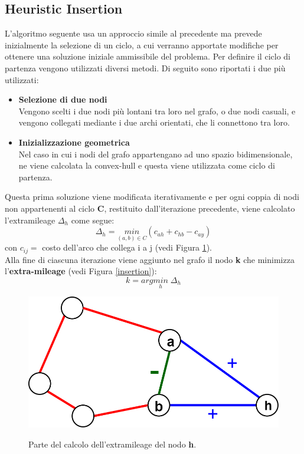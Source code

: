\subsection{Heuristic Insertion}
L'algoritmo seguente usa un approccio simile al precedente ma prevede inizialmente la selezione di un ciclo, a cui verranno apportate modifiche per ottenere una soluzione iniziale ammissibile del problema. Per definire il ciclo di partenza vengono utilizzati diversi metodi. Di seguito sono riportati i due più utilizzati:
\begin{itemize}
\item{\textbf{Selezione di due nodi}\\
Vengono scelti i due nodi più lontani tra loro nel grafo, o due nodi casuali, e vengono collegati mediante i due archi orientati, che li connettono tra loro.
}
\item{\textbf{Inizializzazione geometrica}\\
Nel caso in cui i nodi del grafo appartengano ad uno spazio bidimensionale, ne viene calcolata la convex-hull e questa viene utilizzata come ciclo di partenza.
}
\end{itemize}
Questa prima soluzione viene modificata iterativamente e per ogni coppia di nodi non appartenenti al ciclo \textbf{C}, restituito dall'iterazione precedente, viene calcolato l'extramileage $\Delta_h$ come segue:
$$\Delta_h = \underset{(a,b)\in C}{min} (c_{ah}+c_{hb}-c_{ay})$$
con $c_{ij}=$ costo dell'arco che collega i a j (vedi Figura \ref{partial_cycle}).\\
Alla fine di ciascuna iterazione viene aggiunto nel grafo il nodo \textbf{k} che minimizza l'\textbf{extra-mileage} (vedi Figura \ref{insertion}):\\
$$k = arg\underset{h}{min}\;\Delta_{h}$$
\begin{figure}[H] 
\begin{center} 
  \includegraphics[scale=0.2]{Images/partial_cycle}\\ 
  \caption{\footnotesize{Parte del calcolo dell'extramileage del nodo \textbf{h}.}}
  \label{partial_cycle}
\end{center}
\end{figure}
